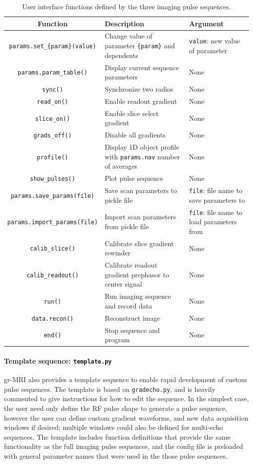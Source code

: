 \documentclass[10pt,letterpaper]{article}
\begin{document}
\begin{table}
\begin{tabularx}{\textwidth}{|c|X|X|}
	\hline
	\textbf{Function} & \textbf{Description} & \textbf{Argument}\\ \hline
	\texttt{params.set\_\{param\}(value)} & Change value of parameter \texttt{\{param\}} and dependents & \texttt{value}: new value of parameter \\ \hline
	\texttt{params.param\_table()} & Display current sequence parameters & None \\ \hline
	\texttt{sync()} & Synchronize two radios & None \\ \hline
	\texttt{read\_on()} & Enable readout gradient & None \\ \hline
	\texttt{slice\_on()} & Enable slice select gradient & None \\ \hline
	\texttt{grads\_off()} & Disable all gradients & None \\ \hline
	\texttt{profile()} & Display 1D object profile with \texttt{params.nav} number of averages & None\\ \hline
	\texttt{show\_pulses()} & Plot pulse sequence & None \\ \hline
	\texttt{params.save\_params(file)} & Save scan parameters to pickle file & \texttt{file}: file name to save parameters to\\ \hline
	\texttt{params.import\_params(file)} & Import scan parameters from pickle file & \texttt{file}: file name to load parameters from\\ \hline
	\texttt{calib\_slice()} & Calibrate slice gradient rewinder & None \\ \hline
	\texttt{calib\_readout()} & Calibrate readout gradient prephasor to center signal & None \\ \hline
	\texttt{run()} & Run imaging sequence and record data & None \\ \hline
	\texttt{data.recon()} & Reconstruct image & None \\ \hline
	\texttt{end()} & Stop sequence and program & None\\ \hline	
\end{tabularx}
\caption{User interface functions defined by the three imaging pulse sequences.}
\label{table:sequencefunctions}
\end{table}

\paragraph{Template sequence: \texttt{template.py}} 
gr-MRI also provides a template sequence to enable rapid development of custom pulse sequences.  
The template is based on \texttt{gradecho.py}, 
and is heavily commented to give instructions for how to edit the sequence.  
In the simplest case, the user need only define the RF pulse shape to generate a pulse sequence, 
however the user can define custom gradient waveforms, and new data acquisition windows if desired; 
multiple windows could also be defined for multi-echo sequences.  
The template includes function definitions that provide the same functionality as the full imaging pulse sequences, 
and the config file is preloaded with general parameter names that were used in the those pulse sequences.
\end{document}
